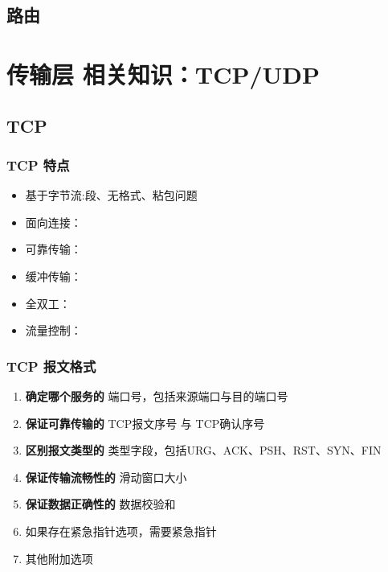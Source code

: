 \documentclass[UTF8,a4paper,12pt]{ctexbook}
\begin{document}
		\subsection{路由}
	
	\section{传输层 相关知识：TCP/UDP }
		\subsection{TCP}
			\subsubsection{TCP 特点}
				\begin{itemize}
					\item 基于字节流:段、无格式、粘包问题
					\item 面向连接：
					\item 可靠传输：
					\item 缓冲传输：
					\item 全双工：
					\item 流量控制：
				\end{itemize}
			\subsubsection{TCP 报文格式}
				\begin{enumerate}[itemindent = 2em]
					\item 	\textbf{确定哪个服务的} 端口号，包括来源端口与目的端口号
					\item 	\textbf{保证可靠传输的} TCP报文序号 与 TCP确认序号
					\item   \textbf{区别报文类型的} 类型字段，包括URG、ACK、PSH、RST、SYN、FIN
					\item 	\textbf{保证传输流畅性的} 滑动窗口大小
					\item   \textbf{保证数据正确性的} 数据校验和
					\item   如果存在紧急指针选项，需要紧急指针
					\item   其他附加选项
				\end{enumerate}
			
\end{document}
